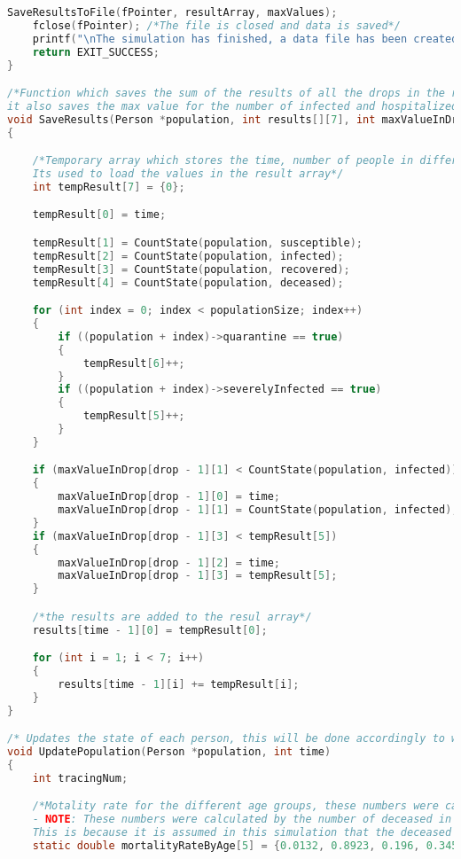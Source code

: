 \begin{lstlisting}[language=c, caption={Our simulations written in c}, captionpos=b, label={snippet:LABELNAVN}]
    SaveResultsToFile(fPointer, resultArray, maxValues);
    fclose(fPointer); /*The file is closed and data is saved*/
    printf("\nThe simulation has finished, a data file has been created\n");
    return EXIT_SUCCESS;
}

/*Function which saves the sum of the results of all the drops in the result array, 
it also saves the max value for the number of infected and hospitalized in each drop in the max value array*/
void SaveResults(Person *population, int results[][7], int maxValueInDrop[][4], int drop, int time)
{

    /*Temporary array which stores the time, number of people in different states and som sub-states.
    Its used to load the values in the result array*/
    int tempResult[7] = {0};

    tempResult[0] = time;

    tempResult[1] = CountState(population, susceptible);
    tempResult[2] = CountState(population, infected);
    tempResult[3] = CountState(population, recovered);
    tempResult[4] = CountState(population, deceased);

    for (int index = 0; index < populationSize; index++)
    {
        if ((population + index)->quarantine == true)
        {
            tempResult[6]++;
        }
        if ((population + index)->severelyInfected == true)
        {
            tempResult[5]++;
        }
    }

    if (maxValueInDrop[drop - 1][1] < CountState(population, infected))
    {
        maxValueInDrop[drop - 1][0] = time;
        maxValueInDrop[drop - 1][1] = CountState(population, infected);
    }
    if (maxValueInDrop[drop - 1][3] < tempResult[5])
    {
        maxValueInDrop[drop - 1][2] = time;
        maxValueInDrop[drop - 1][3] = tempResult[5];
    }

    /*the results are added to the resul array*/
    results[time - 1][0] = tempResult[0];

    for (int i = 1; i < 7; i++)
    {
        results[time - 1][i] += tempResult[i];
    }
}

/* Updates the state of each person, this will be done accordingly to where they are in their incubation/infection period */
void UpdatePopulation(Person *population, int time)
{
    int tracingNum;

    /*Motality rate for the different age groups, these numbers were calculated from the official danish COVID-19 statistics on 09-12-2020.
    - NOTE: These numbers were calculated by the number of deceased in age groups devided by the number of hospitalized in the same age groups.
    This is because it is assumed in this simulation that the deceased were hospitalized before they died of the illness*/
    static double mortalityRateByAge[5] = {0.0132, 0.8923, 0.196, 0.3453, 0.7346};


\end{lstlisting}
